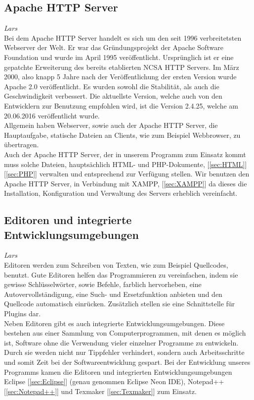 \documentclass[12pt,a4paper,bibliography=totocnumbered,listof=totocnumbered]{scrartcl}
\begin{document}
\subsection{Apache HTTP Server}
\label{sec:Apache}
\emph{Lars}\\
Bei dem Apache HTTP Server handelt es sich um den seit 1996 verbreitetsten Webserver der Welt. Er war das Gründungsprojekt der Apache Software Foundation und wurde im April 1995 veröffentlicht. Ursprünglich ist er eine gepatchte Erweiterung des bereits etablierten NCSA HTTP Servers. Im März 2000, also knapp 5 Jahre nach der Veröffentlichung der ersten Version wurde Apache 2.0 veröffentlicht. Es wurden sowohl die Stabilität, als auch die Geschwindigkeit verbessert. Die aktuellste Version, welche auch von den Entwicklern zur Benutzung empfohlen wird, ist die Version 2.4.25, welche am 20.06.2016 veröffentlicht wurde.\cite{wiki/Apache_HTTP_Server}\cite{apache.org}\\
Allgemein haben Webserver, sowie auch der Apache HTTP Server, die Hauptaufgabe, statische Dateien an Clients, wie zum Beispiel Webbrowser, zu übertragen. \cite{Webserver}\\
Auch der Apache HTTP Server, der in unserem Programm zum Einsatz kommt muss solche Dateien, hauptsächlich HTML- und PHP-Dokumente, [\ref{sec:HTML}][\ref{sec:PHP}] verwalten und entsprechend zur Verfügung stellen. Wir benutzen den Apache HTTP Server, in Verbindung mit XAMPP, [\ref{sec:XAMPP}] da dieses die Installation, Konfiguration und Verwaltung des Servers erheblich vereinfacht.


\subsection{Editoren und integrierte Entwicklungsumgebungen}
\label{sec:Editoren}
\emph{Lars}\\
Editoren werden zum Schreiben von Texten, wie zum Beispiel Quellcodes, benutzt. Gute Editoren helfen das Programmieren zu vereinfachen, indem sie gewisse Schlüsselwörter, sowie Befehle, farblich hervorheben, eine Autovervollständigung, eine Such- und Ersetzfunktion anbieten und den Quellcode automatisch einrücken. Zusätzlich stellen sie eine Schnittstelle für Plugins dar.\cite{Texteditor} \\
Neben Editoren gibt es auch integrierte Entwicklungsumgebungen. Diese bestehen aus einer Sammlung von Computerprogrammen, mit denen es möglich ist, Software ohne die Verwendung vieler einzelner Programme zu entwickeln. Durch sie werden nicht nur Tippfehler verhindert, sondern auch Arbeitsschritte und somit Zeit bei der Softwareentwicklung gespart.\cite{Integrierte_Entwicklungsumgebung}\cite{Medienbruch}
Bei der Entwicklung unseres Programms kamen die Editoren und integrierten Entwicklungsumgebungen Eclipse [\ref{sec:Eclipse}] (genau genommen Eclipse Neon IDE), Notepad++ [\ref{sec:Notepad++}] und Texmaker [\ref{sec:Texmaker}] zum Einsatz.
\end{document}
